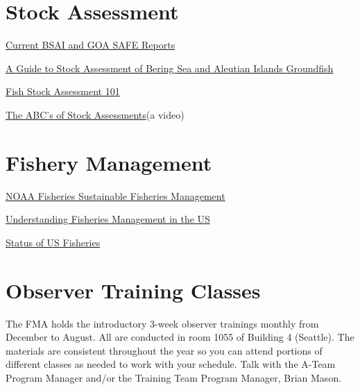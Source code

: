 \documentclass[
  letterpaper,
  DIV=11,
  numbers=noendperiod]{scrreprt}
\begin{document}
\chapter{Stock Assessment}\label{stock-assessment}

\href{https://www.npfmc.org/library/safe-reports/}{Current BSAI and GOA
SAFE Reports}

\href{https://www.npfmc.org/wp-content/PDFdocuments/resources/BS_Stock.pdf}{A
Guide to Stock Assessment of Bering Sea and Aleutian Islands Groundfish}

\href{https://www.st.nmfs.noaa.gov/Assets/stock/documents/Fish_Stock_Assessment_101.pdf}{Fish
Stock Assessment 101}

\href{https://www.youtube.com/watch?v=3UbWMdpavUE}{The ABC's of Stock
Assessments}(a video)

\chapter{Fishery Management}\label{fishery-management}

\href{https://www.fisheries.noaa.gov/topic/sustainable-fisheries/management}{NOAA
Fisheries Sustainable Fisheries Management}

\href{https://www.fisheries.noaa.gov/insight/understanding-fisheries-management-united-states}{Understanding
Fisheries Management in the US}

\href{https://www.fisheries.noaa.gov/topic/sustainable-fisheries/status-of-u.s.-fisheries}{Status
of US Fisheries}

\chapter{Observer Training Classes}\label{observer-training-classes}

The FMA holds the introductory 3-week observer trainings monthly from
December to August. All are conducted in room 1055 of Building 4
(Seattle). The materials are consistent throughout the year so you can
attend portions of different classes as needed to work with your
schedule. Talk with the A-Team Program Manager and/or the Training Team
Program Manager, Brian Mason.
\end{document}
